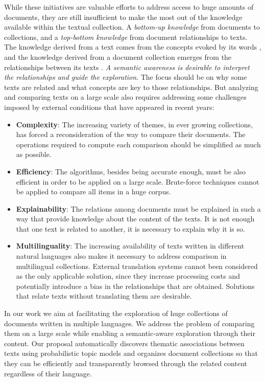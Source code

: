While these initiatives are valuable efforts to address access to huge amounts of documents, they are still insufficient to make the most out of the knowledge available within the textual collection. A \textit{bottom-up knowledge} from documents to collections, and a \textit{top-bottom knowledge} from document relationships to texts. The knowledge derived from a text comes from the concepts evoked by its words \citep{Griffiths2007}, and the knowledge derived from a document collection emerges from the relationships between its texts \citep{Kenter2015}. \textit{A semantic awareness is desirable to interpret the relationships and guide the exploration}. The focus should be on why some texts are related and what concepts are key to those relationships. But analyzing and comparing texts on a large scale also requires addressing some challenges imposed by external conditions that have appeared in recent years:
\begin{itemize}
\item \textbf{Complexity}: The increasing variety of themes, in ever growing collections, has forced a reconsideration of the way to compare their documents. The operations required to compute each comparison should be simplified as much as possible.
\item \textbf{Efficiency}: The algorithms, besides being accurate enough, must be also efficient in order to be applied on a large scale. Brute-force techniques cannot be applied to compare all items in a huge corpus.
\item \textbf{Explainability}: The relations among documents must be explained in such a way that provide knowledge about the content of the texts. It is not enough that one text is related to another, it is necessary to explain why it is so. 
\item \textbf{Multilinguality}: The increasing availability of texts written in different natural languages also makes it necessary to address comparison in multilingual collections. External translation systems cannot been considered as the only applicable solution, since they increase processing costs and potentially introduce a bias in the relationships that are obtained. Solutions that relate texts without translating them are desirable.
\end{itemize}

In our work we aim at facilitating the exploration of huge collections of documents written in multiple languages. We address the problem of comparing them on a large scale while enabling a semantic-aware exploration through their content. Our proposal automatically discovers thematic associations between texts using probabilistic topic models and organizes document collections so that they can be efficiently and transparently browsed through the related content regardless of their language.

